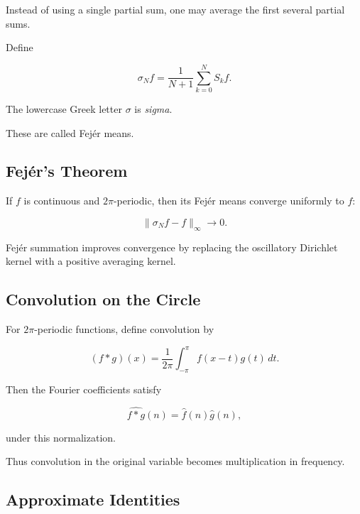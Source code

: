 Instead of using a single partial sum, one may average the first several
partial sums.

Define

\[
\boxed{
\sigma_Nf
=
\frac{1}{N+1}
\sum_{k=0}^{N}S_kf.
}
\]

The lowercase Greek letter \(\sigma\) is \emph{sigma}.

These are called Fej\'er means.

\subsection{Fej\'er's Theorem}
\label{subsec:fejer-theorem}

\begin{theorem}
If \(f\) is continuous and \(2\pi\)-periodic, then its Fej\'er means
converge uniformly to \(f\):

\[
\boxed{
\|\sigma_Nf-f\|_\infty\to0.
}
\]
\end{theorem}

Fej\'er summation improves convergence by replacing the oscillatory
Dirichlet kernel with a positive averaging kernel.

\subsection{Convolution on the Circle}
\label{subsec:periodic-convolution}

For \(2\pi\)-periodic functions, define convolution by

\[
\boxed{
(f*g)(x)
=
\frac{1}{2\pi}
\int_{-\pi}^{\pi}
f(x-t)g(t)\,dt.
}
\]

Then the Fourier coefficients satisfy

\[
\boxed{
\widehat{f*g}(n)
=
\widehat{f}(n)\widehat{g}(n),
}
\]

under this normalization.

Thus convolution in the original variable becomes multiplication in
frequency.

\subsection{Approximate Identities}
\label{subsec:approximate-identities}

